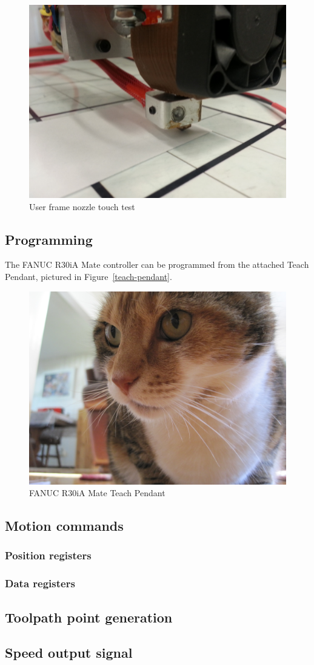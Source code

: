 \begin{figure}
    \centering
    \includegraphics[width=.8\linewidth]{figures/nozzle-paper}
    \caption{User frame nozzle touch test}
    \label{fig:nozzle-touch}
\end{figure}

\subsection{Programming}
The FANUC R30iA Mate controller can be programmed from the attached Teach Pendant, pictured in Figure~\ref{teach-pendant}.

\begin{figure}
    \centering
    \includegraphics[width=.8\linewidth]{figures/temp-cat}
    \caption{FANUC R30iA Mate Teach Pendant}
    \label{fig:teach-pendant}
\end{figure}




\subsection{Motion commands}

\subsubsection{Position registers}
\subsubsection{Data registers}
\subsection{Toolpath point generation}

\subsection{Speed output signal}

